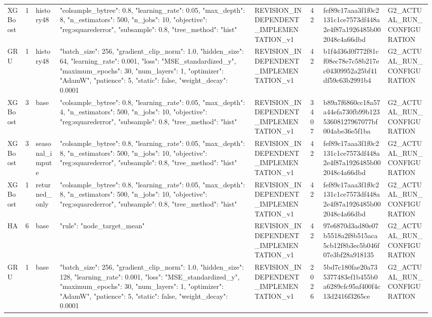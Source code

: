\begin{longtable}{llllllll}
XGBoost & 1 & history48 & {"colsample\_bytree": 0.8, "learning\_rate": 0.05, "max\_depth": 8, "n\_estimators": 500, "n\_jobs": 10, "objective": "reg:squarederror", "subsample": 0.8, "tree\_method": "hist"} & REVISION\_INDEPENDENT\_IMPLEMENTATION\_v1 & 42 & fef89c17aaa3f1f0c2131c1ce7573df448a2e4f87a1926485b002048c4a66dbd & G2\_ACTUAL\_RUN\_CONFIGURATION \\
GRU & 1 & history48 & {"batch\_size": 256, "gradient\_clip\_norm": 1.0, "hidden\_size": 64, "learning\_rate": 0.001, "loss": "MSE\_standardized\_y", "maximum\_epochs": 30, "num\_layers": 1, "optimizer": "AdamW", "patience": 5, "static": false, "weight\_decay": 0.0001} & REVISION\_INDEPENDENT\_IMPLEMENTATION\_v1 & 42 & b1f4d36d0f772f81cf08ec78e7c58b217ec04309952a25bf41df59c63b2991b4 & G2\_ACTUAL\_RUN\_CONFIGURATION \\
XGBoost & 3 & base & {"colsample\_bytree": 0.8, "learning\_rate": 0.05, "max\_depth": 4, "n\_estimators": 500, "n\_jobs": 10, "objective": "reg:squarederror", "subsample": 0.8, "tree\_method": "hist"} & REVISION\_INDEPENDENT\_IMPLEMENTATION\_v1 & 3407 & b89a7f6860cc18a57a44efa730fb99b12353608127967077bf004abe36e5f1ba & G2\_ACTUAL\_RUN\_CONFIGURATION \\
XGBoost & 3 & seasonal\_impute & {"colsample\_bytree": 0.8, "learning\_rate": 0.05, "max\_depth": 8, "n\_estimators": 500, "n\_jobs": 10, "objective": "reg:squarederror", "subsample": 0.8, "tree\_method": "hist"} & REVISION\_INDEPENDENT\_IMPLEMENTATION\_v1 & 42 & fef89c17aaa3f1f0c2131c1ce7573df448a2e4f87a1926485b002048c4a66dbd & G2\_ACTUAL\_RUN\_CONFIGURATION \\
XGBoost & 1 & returned\_only & {"colsample\_bytree": 0.8, "learning\_rate": 0.05, "max\_depth": 8, "n\_estimators": 500, "n\_jobs": 10, "objective": "reg:squarederror", "subsample": 0.8, "tree\_method": "hist"} & REVISION\_INDEPENDENT\_IMPLEMENTATION\_v1 & 42 & fef89c17aaa3f1f0c2131c1ce7573df448a2e4f87a1926485b002048c4a66dbd & G2\_ACTUAL\_RUN\_CONFIGURATION \\
HA & 6 & base & {"rule": "node\_target\_mean"} & REVISION\_INDEPENDENT\_IMPLEMENTATION\_v1 & 42 & 97e6870d3ad80e07b5518a2f8b515aca5cb12f8b3ec5b046f07e3bf28a918135 & G2\_ACTUAL\_RUN\_CONFIGURATION \\
GRU & 1 & base & {"batch\_size": 256, "gradient\_clip\_norm": 1.0, "hidden\_size": 128, "learning\_rate": 0.001, "loss": "MSE\_standardized\_y", "maximum\_epochs": 30, "num\_layers": 1, "optimizer": "AdamW", "patience": 5, "static": false, "weight\_decay": 0.0001} & REVISION\_INDEPENDENT\_IMPLEMENTATION\_v1 & 2026 & 5bd7c180fae20a735377483ef1b455b0a6289cfc95af400f4c13d2416f3265ce & G2\_ACTUAL\_RUN\_CONFIGURATION \\

\end{longtable}
